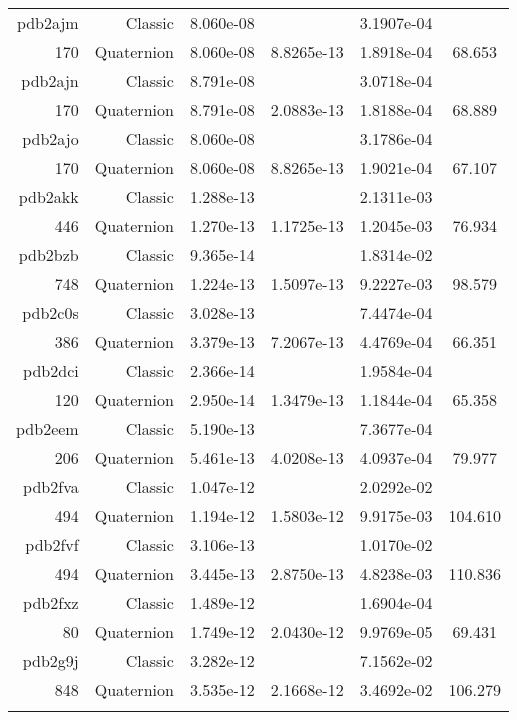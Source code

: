 \begin{xltabular}{\textwidth}{r|rS[table-format=1.3e+2]S[table-format=1.4e+2]S[table-format=1.4e+2]S[table-format=-1.3]}
pdb2ajm & Classic & 8.060e-08 &  & 3.1907e-04 & \\
170 & Quaternion & 8.060e-08 & 8.8265e-13 & 1.8918e-04 & 68.653\\  \addlinespace
pdb2ajn & Classic & 8.791e-08 &  & 3.0718e-04 & \\
170 & Quaternion & 8.791e-08 & 2.0883e-13 & 1.8188e-04 & 68.889\\  \addlinespace
pdb2ajo & Classic & 8.060e-08 &  & 3.1786e-04 & \\
170 & Quaternion & 8.060e-08 & 8.8265e-13 & 1.9021e-04 & 67.107\\  \addlinespace
pdb2akk & Classic & 1.288e-13 &  & 2.1311e-03 & \\
446 & Quaternion & 1.270e-13 & 1.1725e-13 & 1.2045e-03 & 76.934\\  \addlinespace
pdb2bzb & Classic & 9.365e-14 &  & 1.8314e-02 & \\
748 & Quaternion & 1.224e-13 & 1.5097e-13 & 9.2227e-03 & 98.579\\  \addlinespace
pdb2c0s & Classic & 3.028e-13 &  & 7.4474e-04 & \\
386 & Quaternion & 3.379e-13 & 7.2067e-13 & 4.4769e-04 & 66.351\\  \addlinespace
pdb2dci & Classic & 2.366e-14 &  & 1.9584e-04 & \\
120 & Quaternion & 2.950e-14 & 1.3479e-13 & 1.1844e-04 & 65.358\\  \addlinespace
pdb2eem & Classic & 5.190e-13 &  & 7.3677e-04 & \\
206 & Quaternion & 5.461e-13 & 4.0208e-13 & 4.0937e-04 & 79.977\\  \addlinespace
pdb2fva & Classic & 1.047e-12 &  & 2.0292e-02 & \\
494 & Quaternion & 1.194e-12 & 1.5803e-12 & 9.9175e-03 & 104.610\\  \addlinespace
pdb2fvf & Classic & 3.106e-13 &  & 1.0170e-02 & \\
494 & Quaternion & 3.445e-13 & 2.8750e-13 & 4.8238e-03 & 110.836\\  \addlinespace
pdb2fxz & Classic & 1.489e-12 &  & 1.6904e-04 & \\
80 & Quaternion & 1.749e-12 & 2.0430e-12 & 9.9769e-05 & 69.431\\  \addlinespace
pdb2g9j & Classic & 3.282e-12 &  & 7.1562e-02 & \\
848 & Quaternion & 3.535e-12 & 2.1668e-12 & 3.4692e-02 & 106.279\\  \addlinespace

\end{xltabular}
